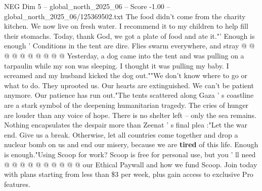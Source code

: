 \begin{textsample}{NEG Dim 5 – global\_north\_2025\_06 – Score -1.00 – global\_north\_2025\_06/125369502.txt}
The food didn't come from the charity kitchen.
We now live on fresh water.
I recommend it to my children to help fill their stomachs.
Today, thank God, we got a plate of food and ate it."' Enough is enough ' Conditions in the tent are dire.
Flies swarm everywhere, and stray @ @ @ @ @ @ @ @ @ @ Yesterday, a dog came into the tent and was pulling on a tarpaulin while my son was sleeping.
I thought it was pulling my baby.
I screamed and my husband kicked the dog out.""We don't know where to go or what to do.
They uprooted us.
Our hearts are extinguished.
We can't be patient anymore.
Our patience has run out."The tents scattered along Gaza ' s coastline are a stark symbol of the deepening humanitarian tragedy.
The cries of hunger are louder than any voice of hope.
There is no shelter left -- only the sea remains.
Nothing encapsulates the despair more than Zeenat ' s final plea :"Let the war end.
Give us a break.
Otherwise, let all countries come together and drop a nuclear bomb on us and end our misery, because we are \textbf{tired} of this life.
Enough is enough."Using Scoop for work?
Scoop is free for personal use, but you ' ll need @ @ @ @ @ @ @ @ @ @ our Ethical Paywall and how we fund Scoop.
Join today with plans starting from less than \$3 per week, plus gain access to exclusive Pro features.

\end{textsample}
